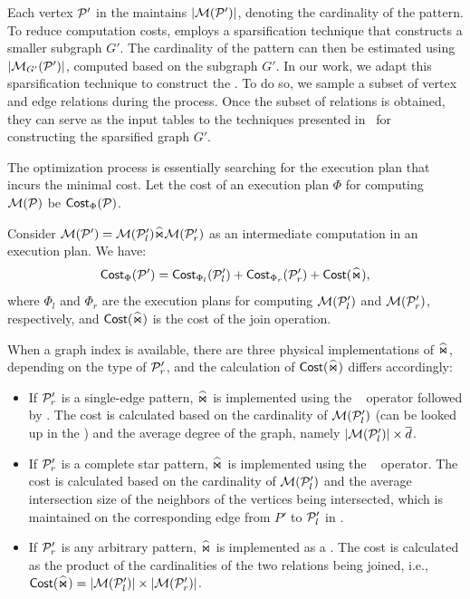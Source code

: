  Each vertex $\mathcal{P}'$ in the \glogue maintains $|\mathcal{M}(\mathcal{P}')|$, denoting the cardinality of the pattern. To reduce computation costs, \glogs employs a sparsification technique that constructs a smaller subgraph $G'$. The cardinality of the pattern can then be estimated using $|\mathcal{M}_{G'}(\mathcal{P}')|$, computed based on the subgraph $G'$. In our work, we adapt this sparsification technique to construct the \glogue. To do so, we sample a subset of vertex and edge relations during the \rgmapping process. Once the subset of relations is obtained, they can serve as the input tables to the techniques presented in~\cite{gart} for constructing the sparsified graph $G'$.


 The optimization process is essentially searching for the execution plan that incurs the minimal cost. Let the cost of an execution plan $\Phi$ for computing $\mathcal{M}(\mathcal{P})$ be ${\mathsf{Cost}}_\Phi(\mathcal{P})$. %

Consider $\mathcal{M}(\mathcal{P}') = \mathcal{M}(\mathcal{P}'_l) \widehat{\Join} \mathcal{M}(\mathcal{P}'_r)$ as an intermediate computation in an execution plan. We have:
\[
{\mathsf{Cost}}_{\Phi}(\mathcal{P}') = {\mathsf{Cost}}_{\Phi_l}(\mathcal{P}'_l) + {\mathsf{Cost}}_{\Phi_r}(\mathcal{P}'_r) + {\mathsf{Cost}}(\widehat{\Join}),
\]
where $\Phi_l$ and $\Phi_r$ are the execution plans for computing $\mathcal{M}(\mathcal{P}'_l)$ and $\mathcal{M}(\mathcal{P}'_r)$, respectively, and ${\mathsf{Cost}}(\widehat{\Join})$ is the cost of the join operation.

When a graph index is available, there are three physical implementations of $\widehat{\Join}$, depending on the type of $\mathcal{P}'_r$, and the calculation of ${\mathsf{Cost}}(\widehat{\Join})$ differs accordingly:
\begin{itemize}
\item If $\mathcal{P}'_r$ is a single-edge pattern, $\widehat{\Join}$ is implemented using the \expandedge~ operator followed by \getvertex. The cost is calculated based on the cardinality of $\mathcal{M}(\mathcal{P}'_l)$ (can be looked up in the \glogue) and the average degree of the graph, namely $|\mathcal{M}(\mathcal{P}'_l)| \times \overline{d}$.
\item If $\mathcal{P}'_r$ is a complete star pattern, $\widehat{\Join}$ is implemented using the \expandintersect~ operator. The cost is calculated based on the cardinality of $\mathcal{M}(\mathcal{P}'_l)$ and the average intersection size of the neighbors of the vertices being intersected, which is maintained on the corresponding edge from $P'$ to $\mathcal{P}'_l$ in \glogue.
\item  If $\mathcal{P}'_r$ is any arbitrary pattern, $\widehat{\Join}$ is implemented as a \hashjoin. The cost is calculated as the product of the cardinalities of the two relations being joined, i.e., ${\mathsf{Cost}}(\widehat{\Join}) = |\mathcal{M}(\mathcal{P}'_l)| \times |\mathcal{M}(\mathcal{P}'_r)|$.
\end{itemize}

